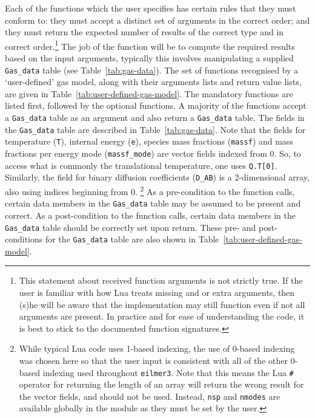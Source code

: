 Each of the functions which the user specifies has certain rules
that they must conform to: they must accept a distinct set of arguments
in the correct order; and they must return the expected number of results
of the correct type and in correct order.\footnote{This statement about received function
arguments is not strictly true.  If the user is familiar with how Lua treats missing
and or extra arguments, then (s)he will be aware that the implementation may still
function even if not all arguments are present.  In practice and for ease of understanding
the code, it is best to stick to the documented function signatures.}
The job of the function will be to compute the required results
based on the input arguments, typically this involves manipulating
a supplied \texttt{Gas\_data} table (see Table~\ref{tab:gas-data}).
The set of functions recognised by a `user-defined' gas model, 
along with their arguments lists and return value lists, are given
in Table~\ref{tab:user-defined-gas-model}.
The mandatory functions are listed first, followed by the optional functions.
A majority of the functions accept a \texttt{Gas\_data} table as an argument
and also return a \texttt{Gas\_data} table.
The fields in the \texttt{Gas\_data} table are described in Table~\ref{tab:gas-data}.
Note that the fields for temperature (\texttt{T}), internal energy (\texttt{e}),
species mass fractions (\texttt{massf}) and mass fractions per energy mode (\texttt{massf\_mode})
are vector fields indexed from 0.
So, to access what is commonly the translational temperature, one uses
\texttt{Q.T[0]}.
Similarly, the field for binary diffusion coefficients (\texttt{D\_AB})
is a 2-dimensional array, also using indices beginning from 0.
\footnote{While typical Lua code uses 1-based indexing,
the use of 0-based indexing was chosen here so that the user input 
is consistent with all of the other 0-based indexing used throughout \texttt{eilmer3}.
Note that this means the Lua \texttt{\#} operator for returning the
length of an array will return the wrong result for the vector fields,
and should not be used.
Instead, \texttt{nsp} and \texttt{nmodes} are available globally in
the module as they must be set by the user.}
As a pre-condition to the function calls, certain data members in the
\texttt{Gas\_data} table may be assumed to be present and correct.
As a post-condition to the function calls, certain data members in the
\texttt{Gas\_data} table should be correctly set upon return.
These pre- and post-conditions for the \texttt{Gas\_data} table
are also shown in Table~\ref{tab:user-defined-gas-model}.

